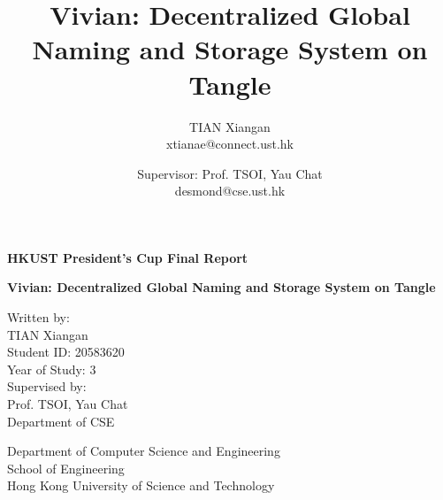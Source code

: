 \documentclass[conference, 10pt]{IEEEtran}
\begin{document}
\begin{titlepage}
    \begin{center}
        \vspace*{2cm}

        \LARGE
        \textbf{HKUST President's Cup Final Report}
        \vspace{0.5cm}

        \Huge
        \textbf{Vivian: Decentralized Global Naming and Storage System on Tangle}

        \vfill

        \Large
        Written by: \\
        \vspace{0.2cm}
        TIAN Xiangan \\
        \vspace{0.2cm}
        Student ID: 20583620 \\
        \vspace{0.2cm}
        Year of Study: 3 \\
        \vspace{1.5cm}
        Supervised by: \\

        \vspace{0.2cm}
        Prof. TSOI, Yau Chat \\
        \vspace{0.2cm}
        Department of CSE


        \vfill

        \vspace{0.8cm}

        \large
        Department of Computer Science and Engineering \\
        \vspace{0.15cm}
        School of Engineering \\
        \vspace{0.15cm}
        Hong Kong University of Science and Technology

    \end{center}
\end{titlepage}

\title{Vivian: Decentralized Global Naming and Storage System on Tangle}

\author{
    TIAN Xiangan \\
    xtianae@connect.ust.hk
    \and
    Supervisor: Prof. TSOI, Yau Chat \\
    desmond@cse.ust.hk
}

\maketitle
\end{document}
